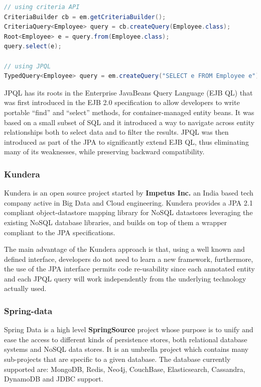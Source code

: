\begin{lstlisting}[language=Java, caption=Create queries with JPA, label=code:jpa-queries]
// using criteria API
CriteriaBuilder cb = em.getCriteriaBuilder();
CriteriaQuery<Employee> query = cb.createQuery(Employee.class);
Root<Employee> e = query.from(Employee.class);
query.select(e);
  
// using JPQL
TypedQuery<Employee> query = em.createQuery("SELECT e FROM Employee e");
\end{lstlisting}

\noindent JPQL has its roots in the Enterprise JavaBeans Query Language (EJB QL) that was first introduced in the EJB 2.0 specification to allow developers to write portable ``find'' and ``select'' methods, for container-managed entity beans. It was based on a small subset of SQL and it introduced a way to navigate across entity relationships both to select data and to filter the results.
JPQL was then introduced as part of the JPA to significantly extend EJB QL, thus eliminating many of its weaknesses, while preserving backward compatibility.

\subsubsection{Kundera}
Kundera is an open source project started by \textbf{Impetus Inc.} an India based tech company active in Big Data and Cloud engineering.
Kundera provides a JPA 2.1 compliant object-datastore mapping library for NoSQL datastores leveraging the existing NoSQL database libraries, and builds on top of them a wrapper compliant to the JPA specifications.

\noindent The main advantage of the Kundera approach is that, using a well known and defined interface, developers do not need to learn a new framework, furthermore, the use of the JPA interface permits code re-usability since each annotated entity and each JPQL query will work independently from the underlying technology actually used.

\subsubsection{Spring-data}
Spring Data \cite{online:spring-data} is a high level \textbf{SpringSource} project whose purpose is to unify and ease the access to different kinds of persistence stores, both relational database systems and NoSQL data stores. It is an umbrella project which contains many sub-projects that are specific to a given database. The database currently supported are: MongoDB, Redis, Neo4j, CouchBase, Elasticsearch, Cassandra, DynamoDB and JDBC support.

